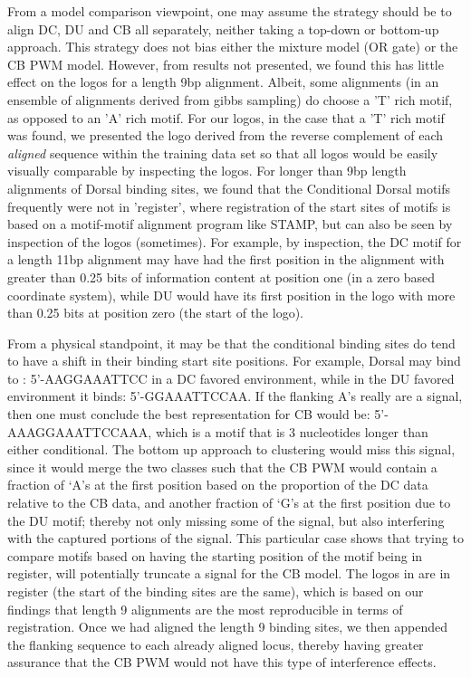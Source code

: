 From a model comparison viewpoint, one may assume the strategy should be to align DC, DU and CB all separately, neither taking a top-down or bottom-up approach.  This strategy does not bias either the mixture model (OR gate) or the CB PWM model.  However, from results not presented, we found this has little effect on the logos for a length 9bp alignment.  Albeit, some alignments (in an ensemble of alignments derived from gibbs sampling) do choose a 'T' rich motif, as opposed to an 'A' rich motif.  For our logos, in the case that a 'T' rich motif was found, we presented the logo derived from the reverse complement of each \textit{aligned} sequence within the training data set so that all logos would be easily visually comparable by inspecting the logos.  For longer than 9bp length alignments of Dorsal binding sites, we found that the Conditional Dorsal motifs frequently were not in 'register', where registration of the start sites of motifs is based on a motif-motif alignment program like STAMP\cite{pmid17478497}, but can also be seen by inspection of the logos (sometimes).  For example, by inspection, the DC motif for a length 11bp alignment may have had the first position in the alignment with greater than 0.25 bits of information content at position one (in a zero based coordinate system), while DU would have its first position in the logo with more than 0.25 bits at position zero (the start of the logo).

From a physical standpoint, it may be that the conditional binding sites do tend to have a shift in their binding start site positions.  For example, Dorsal may bind to :  5'-AAGGAAATTCC in a DC favored environment, while in the DU favored environment it binds: 5'-GGAAATTCCAA.  If the flanking A's really are a signal, then one must conclude the best representation for CB would be: 5'-AAAGGAAATTCCAAA, which is a motif that is 3 nucleotides longer than either conditional.  The bottom up approach to clustering would miss this signal, since it would merge the two classes such that the CB PWM would contain a fraction of `A's at the first position based on the proportion of the DC data relative to the CB data, and another fraction of `G's at the first position due to the DU motif; thereby not only missing some of the signal, but also interfering with the captured portions of the signal.  This particular case shows that trying to compare motifs based on having the starting position of the motif being in register, will potentially truncate a signal for the CB model.  The logos in  are in register (the start of the binding sites are the same), which is based on our findings that length 9 alignments are the most reproducible in terms of registration.  Once we had aligned the length 9 binding sites, we then appended the flanking sequence to each already aligned locus, thereby having greater assurance that the CB PWM would not have this type of interference effects.


